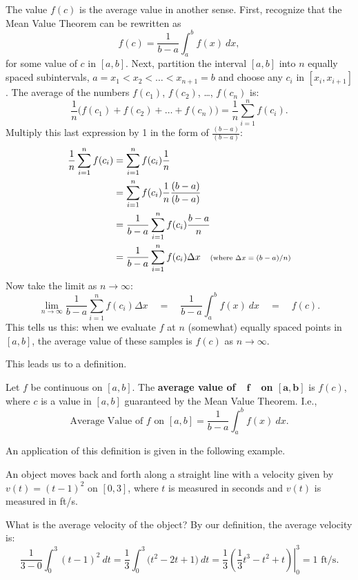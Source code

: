 The value $f(c)$ is the average value in another sense. First, recognize that the Mean Value Theorem can be rewritten as
\[f(c) = \frac{1}{b-a}\int_a^b f(x)\ dx,\]
for some value of $c$ in $[a,b]$. Next, partition the interval $[a,b]$ into $n$ equally spaced subintervals, $a=x_1 < x_2 < \dots < x_{n+1}=b$ and choose any $c_i$ in $[x_i,x_{i+1}]$. The average of the numbers $f(c_1)$, $f(c_2)$, \dots, $f(c_n)$ is:
\[\frac1n\Big(f(c_1) + f(c_2) + \dots + f(c_n)\Big) = \frac1n\sum_{i=1}^n f(c_i).\]
Multiply this last expression by 1 in the form of $\frac{(b-a)}{(b-a)}$:
\begin{align*}
	\frac1n\sum_{i=1}^n f(c_i)
	&= \sum_{i=1}^n f(c_i)\frac1n \\
	&= \sum_{i=1}^n f(c_i)\frac1n \frac{(b-a)}{(b-a)} \\
	&= \frac{1}{b-a} \sum_{i=1}^n f(c_i)\frac{b-a}n  \\
	&=\frac{1}{b-a} \sum_{i=1}^n f(c_i)\Delta x
	\quad \text{\scriptsize (where $\Delta x = (b-a)/n$)} %
\end{align*}
Now take the limit as $n\to\infty$:
\[
 \lim_{n\to\infty} \frac{1}{b-a} \sum_{i=1}^n f(c_i)\Delta x\quad
 = \quad \frac{1}{b-a} \int_a^b f(x)\ dx\quad = \quad  f(c).
\]
This tells us this: when we evaluate $f$ at $n$ (somewhat) equally spaced points in $[a,b]$, the average value of these samples is $f(c)$ as $n\to\infty$.

This leads us to a definition.

\begin{definition}\label{def:av_val}
Let $f$ be continuous on $[a,b]$. The \textbf{average value of\ \ $\mathbf{f}$\ \ on $\mathbf{[a,b]}$} is $f(c)$, where $c$ is a value in $[a,b]$ guaranteed by the Mean Value Theorem. I.e., 
\[\text{Average Value of $f$ on $[a,b]$} = \frac{1}{b-a}\int_a^b f(x)\ dx.\]
\end{definition}

An application of this definition is given in the following example.

\begin{example}\label{ex_ftc10}
An object moves back and forth along a straight line with a velocity given by $v(t) = (t-1)^2$ on $[0,3]$, where $t$ is measured in seconds and $v(t)$ is measured in ft/s. 

What is the average velocity of the object?
\solution
By our definition, the average velocity is:
\[
\frac1{3-0}\int_0^3 (t-1)^2\ dt
= \frac13 \int_0^3 \big(t^2-2t+1\big)\ dt
= \left.\frac13\left(\frac13t^3-t^2+t\right)\right|_0^3
= 1\text{ ft/s}.
\]
\end{example}

